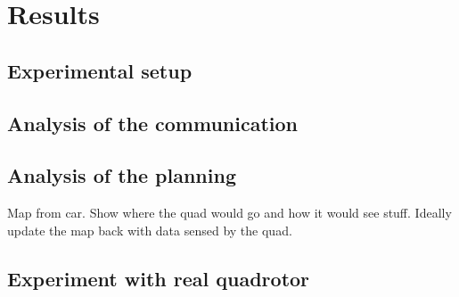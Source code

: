 
\section{Results}

\subsection{Experimental setup}

\subsection{Analysis of the communication}


\subsection{Analysis of the planning}
Map from car.
Show where the quad would go and how it would see stuff.
Ideally update the map back with data sensed by the quad.

\subsection{Experiment with real quadrotor}